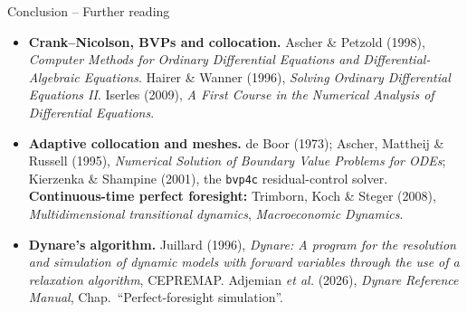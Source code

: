 \documentclass[11pt,aspectratio=169]{beamer}
\begin{document}
\begin{frame}{Conclusion -- Further reading}

\begin{itemize}

\item \textbf{Crank--Nicolson, BVPs and collocation.}  Ascher \&
  Petzold (1998), \emph{Computer Methods for Ordinary Differential
    Equations and Differential-Algebraic Equations}. Hairer \& Wanner
  (1996), \emph{Solving Ordinary Differential Equations II}. Iserles
  (2009), \emph{A First Course in the Numerical Analysis of
    Differential Equations}.\newline

\item \textbf{Adaptive collocation and meshes.} de Boor (1973); Ascher,
  Mattheij \& Russell (1995), \emph{Numerical Solution of Boundary Value
    Problems for ODEs}; Kierzenka \& Shampine (2001), the \texttt{bvp4c}
  residual-control solver. \textbf{Continuous-time perfect foresight:}
  Trimborn, Koch \& Steger (2008), \emph{Multidimensional transitional
    dynamics}, \emph{Macroeconomic Dynamics}.\newline

\item \textbf{Dynare's algorithm.} Juillard (1996), \emph{Dynare:
    A program for the resolution and simulation of dynamic models with
    forward variables through the use of a relaxation algorithm},
  CEPREMAP. Adjemian \emph{et al.} (2026), \emph{Dynare Reference
    Manual}, Chap.\ ``Perfect-foresight simulation''.\newline

\end{itemize}

\end{frame}
\end{document}
